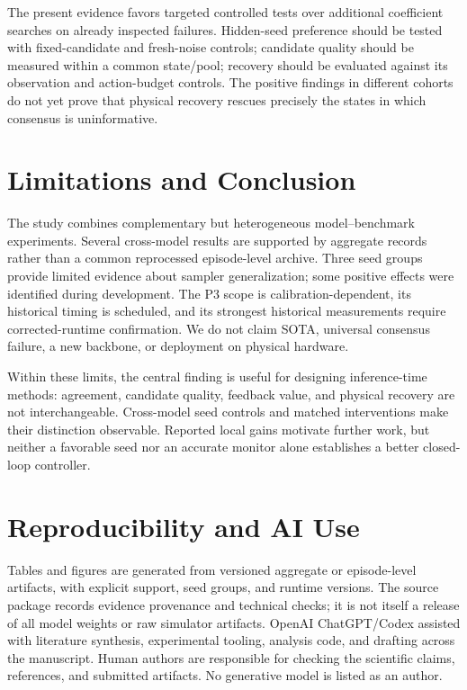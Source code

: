 The present evidence favors targeted controlled tests over additional
coefficient searches on already inspected failures. Hidden-seed preference
should be tested with fixed-candidate and fresh-noise controls; candidate
quality should be measured within a common state/pool; recovery should be
evaluated against its observation and action-budget controls. The positive
findings in different cohorts do not yet prove that physical recovery
rescues precisely the states in which consensus is uninformative.

\section{Limitations and Conclusion}
The study combines complementary but heterogeneous model--benchmark
experiments. Several cross-model results are supported by aggregate records
rather than a common reprocessed episode-level archive. Three seed groups
provide limited evidence about sampler generalization; some positive effects
were identified during development. The P3 scope is calibration-dependent,
its historical timing is scheduled, and its strongest historical measurements
require corrected-runtime confirmation. We do not claim SOTA, universal
consensus failure, a new backbone, or deployment on physical hardware.

Within these limits, the central finding is useful for designing inference-time
methods: agreement, candidate quality, feedback value, and physical recovery
are not interchangeable. Cross-model seed controls and matched interventions
make their distinction observable. Reported local gains motivate further
work, but neither a favorable seed nor an accurate monitor alone establishes
a better closed-loop controller.

\section*{Reproducibility and AI Use}
Tables and figures are generated from versioned aggregate or episode-level
artifacts, with explicit support, seed groups, and runtime versions.
The source package records evidence provenance and technical checks;
it is not itself a release of all model weights or raw simulator artifacts.
OpenAI ChatGPT/Codex assisted with literature synthesis, experimental tooling,
analysis code, and drafting across the manuscript. Human authors are
responsible for checking the scientific claims, references, and submitted
artifacts. No generative model is listed as an author.
\label{sec:main_end}

